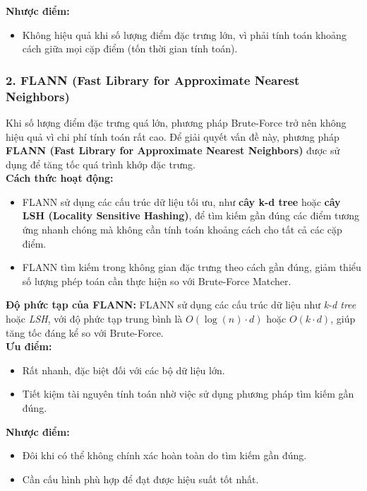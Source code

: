 \textbf{Nhược điểm:}
\begin{itemize}
	\item Không hiệu quả khi số lượng điểm đặc trưng lớn, vì phải tính toán khoảng cách giữa mọi cặp điểm (tốn thời gian tính toán).
\end{itemize}

\subsubsection*{2. FLANN (Fast Library for Approximate Nearest Neighbors)}

Khi số lượng điểm đặc trưng quá lớn, phương pháp Brute-Force trở nên không hiệu quả vì chi phí tính toán rất cao. Để giải quyết vấn đề này, phương pháp \textbf{FLANN (Fast Library for Approximate Nearest Neighbors)} được sử dụng để tăng tốc quá trình khớp đặc trưng.\\

\textbf{Cách thức hoạt động:}
\begin{itemize}
	\item FLANN sử dụng các cấu trúc dữ liệu tối ưu, như \textbf{cây k-d tree} hoặc \textbf{cây LSH (Locality Sensitive Hashing)}, để tìm kiếm gần đúng các điểm tương ứng nhanh chóng mà không cần tính toán khoảng cách cho tất cả các cặp điểm.
	\item FLANN tìm kiếm trong không gian đặc trưng theo cách gần đúng, giảm thiểu số lượng phép toán cần thực hiện so với Brute-Force Matcher.
\end{itemize}

\textbf{Độ phức tạp của FLANN:} FLANN sử dụng các cấu trúc dữ liệu như \textit{k-d tree} hoặc \textit{LSH}, với độ phức tạp trung bình là \(O(\log(n) \cdot d)\) hoặc \(O(k \cdot d)\), giúp tăng tốc đáng kể so với Brute-Force.\\

\textbf{Ưu điểm:}
\begin{itemize}
	\item Rất nhanh, đặc biệt đối với các bộ dữ liệu lớn.
	\item Tiết kiệm tài nguyên tính toán nhờ việc sử dụng phương pháp tìm kiếm gần đúng.
\end{itemize}

\textbf{Nhược điểm:}
\begin{itemize}
	\item Đôi khi có thể không chính xác hoàn toàn do tìm kiếm gần đúng.
	\item Cần cấu hình phù hợp để đạt được hiệu suất tốt nhất.
\end{itemize}

